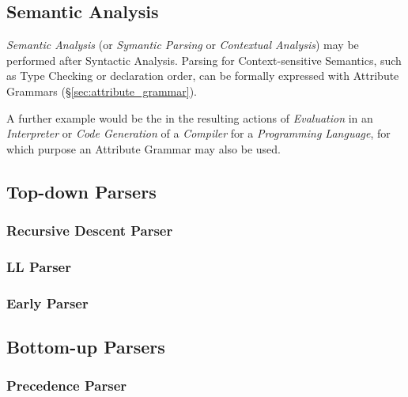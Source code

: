 \subsection{Semantic Analysis}\label{sec:semantic_analysis}

\emph{Semantic Analysis} (or \emph{Symantic Parsing} or
\emph{Contextual Analysis}) may be performed after Syntactic Analysis.
Parsing for Context-sensitive Semantics, such as Type Checking or
declaration order, can be formally expressed with Attribute Grammars
(\S\ref{sec:attribute_grammar}).

A further example would be the in the resulting actions of
\emph{Evaluation} in an \emph{Interpreter} or \emph{Code Generation}
of a \emph{Compiler} for a \emph{Programming Language}, for which
purpose an Attribute Grammar may also be used.



\subsection{Top-down Parsers}

\subsubsection{Recursive Descent Parser}

\subsubsection{LL Parser}

\subsubsection{Early Parser}



\subsection{Bottom-up Parsers}

\subsubsection{Precedence Parser}

